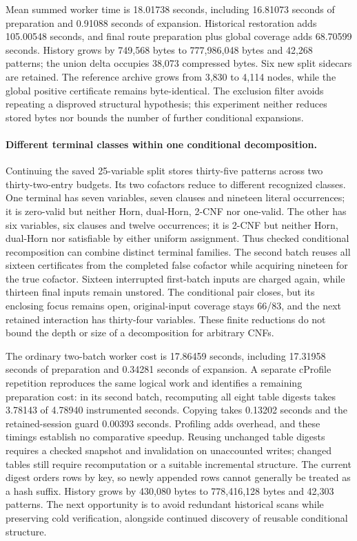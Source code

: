 \documentclass[11pt,a4paper]{article}
\numberwithin{equation}{section}
\theoremstyle{plain}
\theoremstyle{definition}
\theoremstyle{remark}
\begin{document}
Mean summed worker time is 18.01738 seconds, including 16.81073 seconds of preparation and 0.91088 seconds of expansion. Historical restoration adds 105.00548 seconds, and final route preparation plus global coverage adds 68.70599 seconds. History grows by 749,568 bytes to 777,986,048 bytes and 42,268 patterns; the union delta occupies 38,073 compressed bytes. Six new split sidecars are retained. The reference archive grows from 3,830 to 4,114 nodes, while the global positive certificate remains byte-identical. The exclusion filter avoids repeating a disproved structural hypothesis; this experiment neither reduces stored bytes nor bounds the number of further conditional expansions.

\paragraph{Different terminal classes within one conditional decomposition.}
Continuing the saved 25-variable split stores thirty-five patterns across two thirty-two-entry budgets. Its two cofactors reduce to different recognized classes. One terminal has seven variables, seven clauses and nineteen literal occurrences; it is zero-valid but neither Horn, dual-Horn, 2-CNF nor one-valid. The other has six variables, six clauses and twelve occurrences; it is 2-CNF but neither Horn, dual-Horn nor satisfiable by either uniform assignment. Thus checked conditional recomposition can combine distinct terminal families. The second batch reuses all sixteen certificates from the completed false cofactor while acquiring nineteen for the true cofactor. Sixteen interrupted first-batch inputs are charged again, while thirteen final inputs remain unstored. The conditional pair closes, but its enclosing focus remains open, original-input coverage stays 66/83, and the next retained interaction has thirty-four variables. These finite reductions do not bound the depth or size of a decomposition for arbitrary CNFs.

The ordinary two-batch worker cost is 17.86459 seconds, including 17.31958 seconds of preparation and 0.34281 seconds of expansion. A separate cProfile repetition reproduces the same logical work and identifies a remaining preparation cost: in its second batch, recomputing all eight table digests takes 3.78143 of 4.78940 instrumented seconds. Copying takes 0.13202 seconds and the retained-session guard 0.00393 seconds. Profiling adds overhead, and these timings establish no comparative speedup. Reusing unchanged table digests requires a checked snapshot and invalidation on unaccounted writes; changed tables still require recomputation or a suitable incremental structure. The current digest orders rows by key, so newly appended rows cannot generally be treated as a hash suffix. History grows by 430,080 bytes to 778,416,128 bytes and 42,303 patterns. The next opportunity is to avoid redundant historical scans while preserving cold verification, alongside continued discovery of reusable conditional structure.
\end{document}
